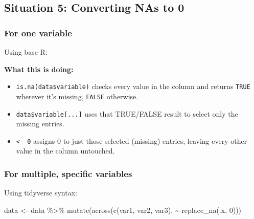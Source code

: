 \documentclass[
  letterpaper,
  DIV=11,
  numbers=noendperiod]{scrreprt}
\newenvironment{Shaded}{\begin{snugshade}}{\end{snugshade}}
\newcommand{\DecValTok}[1]{\textcolor[rgb]{0.68,0.00,0.00}{#1}}
\newcommand{\FunctionTok}[1]{\textcolor[rgb]{0.28,0.35,0.67}{#1}}
\newcommand{\NormalTok}[1]{\textcolor[rgb]{0.00,0.23,0.31}{#1}}
\newcommand{\OtherTok}[1]{\textcolor[rgb]{0.00,0.23,0.31}{#1}}
\newcommand{\SpecialCharTok}[1]{\textcolor[rgb]{0.37,0.37,0.37}{#1}}
\providecommand{\tightlist}{%
  \setlength{\itemsep}{0pt}\setlength{\parskip}{0pt}}\usepackage{longtable,booktabs,array}
\begin{document}
\subsection{\texorpdfstring{\textbf{Situation 5: Converting NAs to
0}}{Situation 5: Converting NAs to 0}}\label{situation-5-converting-nas-to-0}

\subsubsection{For one variable}\label{for-one-variable}

Using base R:

\begin{Shaded}
\end{Shaded}

\textbf{What this is doing:}

\begin{itemize}
\tightlist
\item
  \texttt{is.na(data\$variable)} checks every value in the column and
  returns \texttt{TRUE} wherever it's missing, \texttt{FALSE} otherwise.
\item
  \texttt{data\$variable{[}...{]}} uses that TRUE/FALSE result to select
  only the missing entries.
\item
  \texttt{\textless{}-\ 0} assigns 0 to just those selected (missing)
  entries, leaving every other value in the column untouched.
\end{itemize}

\subsubsection{For multiple, specific
variables}\label{for-multiple-specific-variables}

Using tidyverse syntax:

\begin{Shaded}
\begin{Highlighting}[]
\NormalTok{data }\OtherTok{\textless{}{-}}\NormalTok{ data }\SpecialCharTok{\%\textgreater{}\%}
  \FunctionTok{mutate}\NormalTok{(}\FunctionTok{across}\NormalTok{(}\FunctionTok{c}\NormalTok{(var1, var2, var3), }\SpecialCharTok{\textasciitilde{}} \FunctionTok{replace\_na}\NormalTok{(.x, }\DecValTok{0}\NormalTok{)))}
\end{Highlighting}
\end{Shaded}
\end{document}
